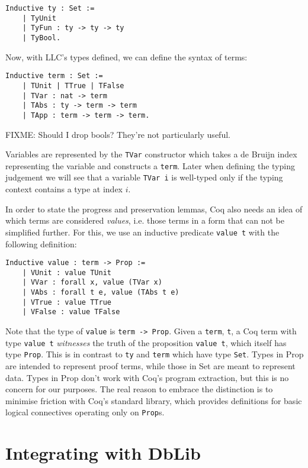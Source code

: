 \documentclass[]{unswthesis}
\let\c\texttt
\begin{document}
\begin{verbatim}
Inductive ty : Set :=
    | TyUnit
    | TyFun : ty -> ty -> ty
    | TyBool.
\end{verbatim}

Now, with LLC's types defined, we can define the syntax of terms:

\begin{verbatim}
Inductive term : Set :=
    | TUnit | TTrue | TFalse
    | TVar : nat -> term
    | TAbs : ty -> term -> term
    | TApp : term -> term -> term.
\end{verbatim}

FIXME: Should I drop bools? They're not particularly useful.

Variables are represented by the \c{TVar} constructor which takes a de Bruijn index representing the variable and constructs a \c{term}. Later when defining the typing judgement we will see that a variable \c{TVar i} is well-typed only if the typing context contains a type at index $i$.

In order to state the progress and preservation lemmas, Coq also needs an idea of which terms are considered \textit{values}, i.e. those terms in a form that can not be simplified further. For this, we use an inductive predicate \c{value t} with the following definition:

\begin{verbatim}
Inductive value : term -> Prop :=
    | VUnit : value TUnit
    | VVar : forall x, value (TVar x)
    | VAbs : forall t e, value (TAbs t e)
    | VTrue : value TTrue
    | VFalse : value TFalse
\end{verbatim}

Note that the type of \c{value} is \c{term -> Prop}. Given a \c{term}, \c{t}, a Coq term with type \c{value t} \textit{witnesses} the truth of the proposition \c{value t}, which itself has type \c{Prop}. This is in contrast to \c{ty} and \c{term} which have type \c{Set}. Types in Prop are intended to represent proof terms, while those in Set are meant to represent data. Types in Prop don't work with Coq's program extraction, but this is no concern for our purposes. The real reason to embrace the distinction is to minimise friction with Coq's standard library, which provides definitions for basic logical connectives operating only on \c{Prop}s.

\section{Integrating with DbLib}
\end{document}
